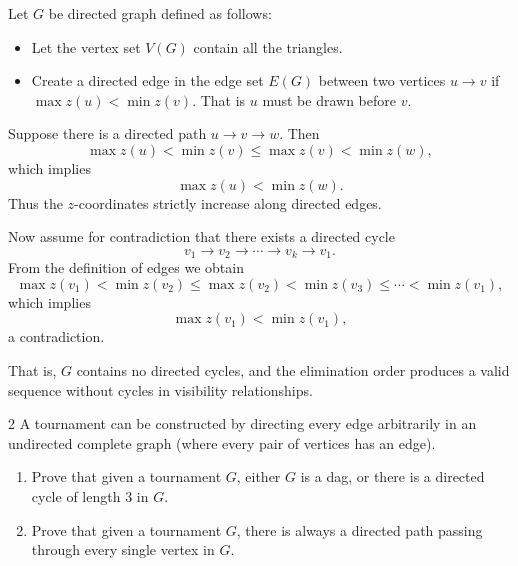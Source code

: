 \documentclass[12pt]{article}
\begin{document}
\begin{solution}
    \bbni
    
    Let $G$ be directed graph defined as follows: 
    \begin{itemize}
        \item Let the vertex set $V(G)$ contain all the triangles.
        \item Create a directed edge in the edge set $E(G)$ between two vertices $u \to v$ if $\max z(u) < \min z(v)$. That is $u$ must be drawn before $v$.
    \end{itemize}
    
    Suppose there is a directed path $u \to v \to w$. Then
    \[\max z(u) < \min z(v) \le \max z(v) < \min z(w),\]
    which implies
    \[\max z(u) < \min z(w).\]
    Thus the $z$-coordinates strictly increase along directed edges.
    
    Now assume for contradiction that there exists a directed cycle
    \[v_1 \to v_2 \to \cdots \to v_k \to v_1.\]
    From the definition of edges we obtain
    \[\max z(v_1) < \min z(v_2) \le \max z(v_2) < \min z(v_3) \le \cdots < \min z(v_1),\]
    which implies
    \[\max z(v_1) < \min z(v_1),\]
    a contradiction.
    
    That is, $G$ contains no directed cycles, and the elimination order produces a valid sequence without cycles in visibility relationships. 
\end{solution}

\newpage 

\begin{problem}{2}
    A tournament can be constructed by directing every edge arbitrarily in an undirected complete graph (where every pair of vertices has an edge).

    \begin{enumerate}
        \item[(a)] Prove that given a tournament $G$, either $G$ is a dag, or there is a directed cycle of length $3$ in $G$.
        
        \item[(b)] Prove that given a tournament $G$, there is always a directed path passing through every single vertex in $G$.
    \end{enumerate}
\end{problem}
\end{document}
